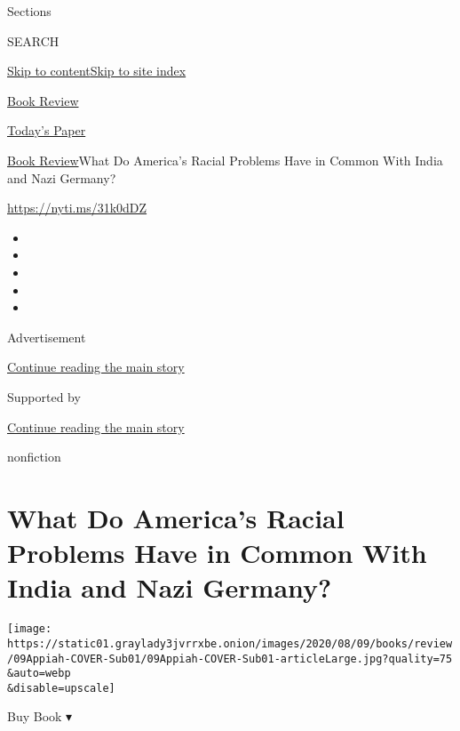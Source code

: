 Sections

SEARCH

\protect\hyperlink{site-content}{Skip to
content}\protect\hyperlink{site-index}{Skip to site index}

\href{https://www.nytimes3xbfgragh.onion/section/books/review}{Book
Review}

\href{https://myaccount.nytimes3xbfgragh.onion/auth/login?response_type=cookie\&client_id=vi}{}

\href{https://www.nytimes3xbfgragh.onion/section/todayspaper}{Today's
Paper}

\href{/section/books/review}{Book Review}\textbar{}What Do America's
Racial Problems Have in Common With India and Nazi Germany?

\url{https://nyti.ms/31k0dDZ}

\begin{itemize}
\item
\item
\item
\item
\item
\end{itemize}

Advertisement

\protect\hyperlink{after-top}{Continue reading the main story}

Supported by

\protect\hyperlink{after-sponsor}{Continue reading the main story}

nonfiction

\hypertarget{what-do-americas-racial-problems-have-in-common-with-india-and-nazi-germany}{%
\section{What Do America's Racial Problems Have in Common With India and
Nazi
Germany?}\label{what-do-americas-racial-problems-have-in-common-with-india-and-nazi-germany}}

\texttt{[image: https://static01.graylady3jvrrxbe.onion/images/2020/08/09/books/review/09Appiah-COVER-Sub01/09Appiah-COVER-Sub01-articleLarge.jpg?quality=75\\\&auto=webp\\\&disable=upscale]}

Buy Book ▾

